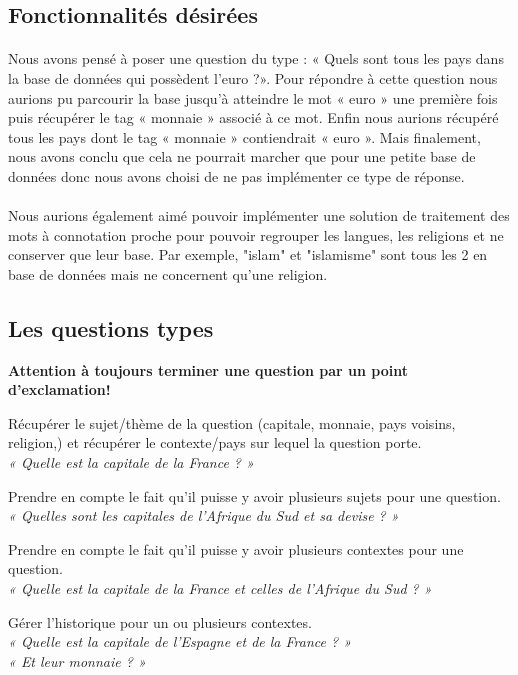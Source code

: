 \documentclass[11pt,a4paper]{article}
\begin{document}
\subsection{Fonctionnalités désirées}

\paragraph{}Nous avons pensé à poser une question du type : «  Quels sont tous les pays dans la base de données qui possèdent l’euro ?». Pour répondre à cette question nous aurions pu parcourir la base jusqu'à atteindre le mot « euro » une première fois puis  récupérer le tag « monnaie » associé à ce mot. Enfin nous aurions récupéré tous les pays dont le tag « monnaie » contiendrait « euro ». Mais finalement, nous avons conclu que cela ne pourrait marcher que pour une petite base de données donc nous avons choisi de ne pas implémenter ce type de réponse. 
\paragraph{}Nous aurions également aimé pouvoir implémenter une solution de traitement des mots à connotation proche pour pouvoir regrouper les langues, les religions et ne conserver que leur base. Par exemple, "islam" et "islamisme" sont tous les 2 en base de données mais ne concernent qu'une religion.

\subsection{Les questions types}

\textbf{Attention à toujours terminer une question par un point d'exclamation!}


Récupérer le sujet/thème de la question (capitale, monnaie, pays voisins, religion,) et récupérer le contexte/pays sur lequel la question porte. \\
\textit{« Quelle est la capitale de la France ? » }

Prendre en compte le fait qu’il puisse y avoir plusieurs sujets pour une question. \\
\textit{« Quelles sont les capitales de l’Afrique du Sud et sa devise ? »}

Prendre en compte le fait qu’il puisse y avoir plusieurs contextes pour une question. \\
\textit{« Quelle est la capitale de la France et celles de l’Afrique du Sud ? »}

Gérer l’historique pour un ou plusieurs contextes. \\
\textit{« Quelle est la capitale de l’Espagne et de la France ? »\\
	« Et leur monnaie ? »}
\end{document}
